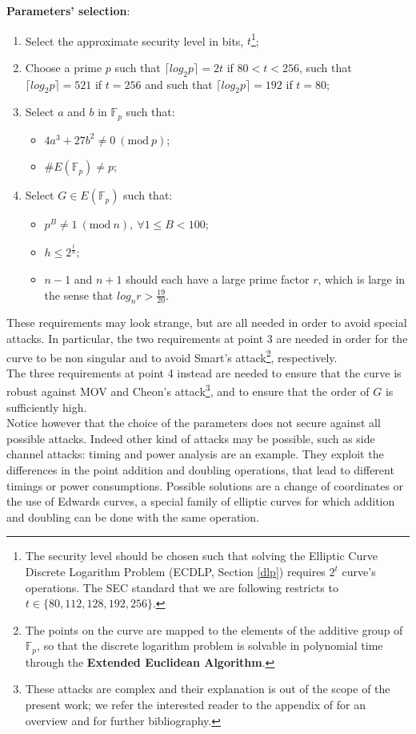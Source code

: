 \bigskip
\bigskip
\bigskip
\bigskip
\bigskip
\noindent
{\bf Parameters' selection}: 
\begin{enumerate}
	\item Select the approximate security level in bits, $t$\footnote{The security level should be chosen such that solving the Elliptic Curve Discrete Logarithm Problem (ECDLP, Section \ref{dlp}) requires $2^t$ curve's operations. The SEC standard that we are following restricts to $t \in \{80, 112, 128, 192, 256\}$.};
	\item Choose a prime $p$ such that $\lceil log_2p\rceil = 2t$ if $80 < t < 256$, such that $\lceil log_2p\rceil = 521$ if $t = 256$ and such that $\lceil log_2p\rceil = 192$ if $t = 80$;
	\item Select $a$ and $b$ in $\mathbb{F}_p$ such that:
	\begin{itemize}
		\item $4a^3 + 27b^2 \neq 0 \ (\text{mod} \ p)$;
		\item $\#E(\mathbb{F}_p) \neq p$;
	\end{itemize} 
	\item Select $G \in E(\mathbb{F}_p)$ such that:
	\begin{itemize}
		\item $p^B \neq 1 \ (\text{mod} \ n), \ \forall 1 \leq B < 100$;
		\item $h \leq 2^{\frac{t}{8}}$;
		\item $n - 1$ and $n + 1$ should each have a large prime factor $r$, which is large in the sense that $log_nr > \frac{19}{20}$.
	\end{itemize}
\end{enumerate}
These requirements may look strange, but are all needed in order to avoid special attacks. In particular, the two requirements at point 3 are needed in order for the curve to be non singular and to avoid Smart's attack\footnote{The points on the curve are mapped to the elements of the additive group of $\mathbb{F}_p$, so that the discrete logarithm problem is solvable in polynomial time through the {\bf Extended Euclidean Algorithm}.}, respectively.
\\
The three requirements at point 4 instead are needed to ensure that the curve is robust against MOV and Cheon's attack\footnote{These attacks are complex and their explanation is out of the scope of the present work; we refer the interested reader to the appendix of \cite{RefWork:2} for an overview and for further bibliography.}, and to ensure that the order of $G$ is sufficiently high.
\\
Notice however that the choice of the parameters does not secure against all possible attacks. Indeed other kind of attacks may be possible, such as side channel attacks: timing and power analysis are an example. They exploit the differences in the point addition and doubling operations, that lead to different timings or power consumptions. Possible solutions are a change of coordinates or the use of Edwards curves, a special family of elliptic curves for which addition and doubling can be done with the same operation.

